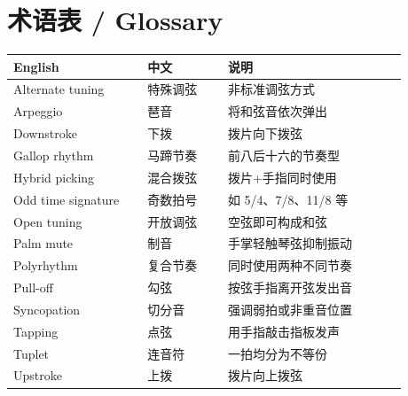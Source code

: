 \chapter{术语表 / Glossary}
\label{ch:glossary}

\begin{center}
\begin{tabular}{>{\raggedright}p{0.30\linewidth} >{\raggedright}p{0.18\linewidth} p{0.40\linewidth}}
\toprule
\textbf{English} & \textbf{中文} & \textbf{说明} \\
\midrule
Alternate tuning   & 特殊调弦 & 非标准调弦方式 \\
Arpeggio           & 琶音     & 将和弦音依次弹出 \\
Downstroke         & 下拨     & 拨片向下拨弦 \\
Gallop rhythm      & 马蹄节奏 & 前八后十六的节奏型 \\
Hybrid picking     & 混合拨弦 & 拨片+手指同时使用 \\
Odd time signature & 奇数拍号 & 如 5/4、7/8、11/8 等 \\
Open tuning        & 开放调弦 & 空弦即可构成和弦 \\
Palm mute          & 制音     & 手掌轻触琴弦抑制振动 \\
Polyrhythm         & 复合节奏 & 同时使用两种不同节奏 \\
Pull-off           & 勾弦     & 按弦手指离开弦发出音 \\
Syncopation        & 切分音   & 强调弱拍或非重音位置 \\
Tapping            & 点弦     & 用手指敲击指板发声 \\
Tuplet             & 连音符   & 一拍均分为不等份 \\
Upstroke           & 上拨     & 拨片向上拨弦 \\
\bottomrule
\end{tabular}
\end{center}
